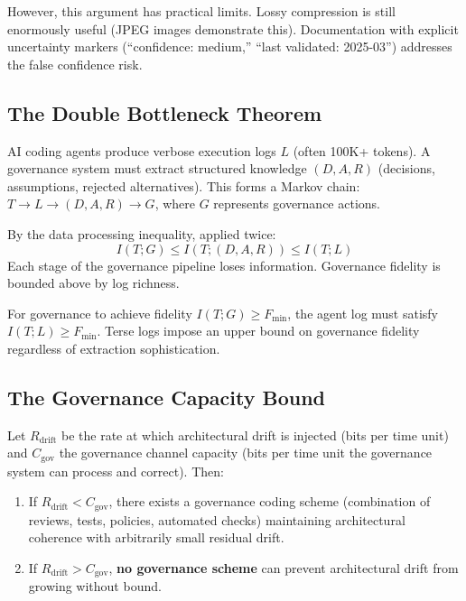 However, this argument has practical limits. Lossy compression is still enormously useful (JPEG images demonstrate this). Documentation with explicit uncertainty markers (``confidence: medium,'' ``last validated: 2025-03'') addresses the false confidence risk.

\subsection{The Double Bottleneck Theorem}

AI coding agents produce verbose execution logs $L$ (often 100K+ tokens). A governance system must extract structured knowledge $(D, A, R)$ (decisions, assumptions, rejected alternatives). This forms a Markov chain: $T \to L \to (D, A, R) \to G$, where $G$ represents governance actions.

\begin{theorem}
\label{thm:double-bottleneck}
By the data processing inequality, applied twice:
\begin{equation}
    I(T; G) \leq I(T; (D, A, R)) \leq I(T; L)
\end{equation}
Each stage of the governance pipeline loses information. Governance fidelity is bounded above by log richness.
\end{theorem}

\begin{corollary}
For governance to achieve fidelity $I(T; G) \geq F_{\min}$, the agent log must satisfy $I(T; L) \geq F_{\min}$. Terse logs impose an upper bound on governance fidelity regardless of extraction sophistication.
\end{corollary}

\subsection{The Governance Capacity Bound}

\begin{proposition}
\label{thm:governance-capacity}
Let $R_{\text{drift}}$ be the rate at which architectural drift is injected (bits per time unit) and $C_{\text{gov}}$ the governance channel capacity (bits per time unit the governance system can process and correct). Then:
\begin{enumerate}
    \item If $R_{\text{drift}} < C_{\text{gov}}$, there exists a governance coding scheme (combination of reviews, tests, policies, automated checks) maintaining architectural coherence with arbitrarily small residual drift.
    \item If $R_{\text{drift}} > C_{\text{gov}}$, \textbf{no governance scheme} can prevent architectural drift from growing without bound.
\end{enumerate}
\end{proposition}

